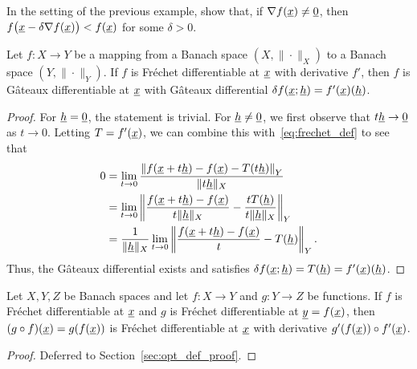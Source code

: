 \begin{problem}
In the setting of the previous example, show that, if $\nabla f (\underline{x}) \neq \underline{0}$, then $f\big(\underline{x}-\delta \nabla f(\underline{x})\big) < f(\underline{x})$ for some $\delta >0$.
\end{problem}

\begin{theorem} \label{theorem:frechet2gateaux}
Let $f \colon X \rightarrow Y$ be a mapping from a Banach space $(X,\|\cdot\|_X)$ to a Banach space $(Y,\|\cdot\|_Y)$.
If $f$ is Fr\'{e}chet differentiable at $\underline{x}$ with derivative $f'$, then $f$ is G\^{a}teaux differentiable at $\underline{x}$ with G\^{a}teaux differential $\delta f (\underline{x};\underline{h}) = f'(\underline{x}) (\underline{h})$.
\end{theorem}
\begin{proof}
For $\underline{h} = \underline{0}$, the statement is trivial.
For $\underline{h} \neq \underline{0}$, we first observe that $t\underline{h} \to \underline{0}$ as $t \to 0$.
Letting $T=f'(\underline{x})$, we can combine this with~\eqref{eq:frechet_def} to see that
\begin{align*}
0 &= \lim_{t \to 0} \frac{\left\|f(\underline{x}+ t\underline{h}) - f(\underline{x}) - T(t\underline{h}) \right\|_Y}{\| t\underline{h} \|_X} \\
&= \lim_{t \to 0} \left\|\frac{f(\underline{x}+ t\underline{h}) - f(\underline{x})}{t \| \underline{h} \|_X} - \frac{ t T(\underline{h})}{t \| \underline{h} \|_X} \right\|_Y \\
&= \frac{1}{\| \underline{h} \|_X}  \lim_{t \to 0} \left\|\frac{f(\underline{x}+ t\underline{h}) - f(\underline{x})}{t} - T(\underline{h}) \right\|_Y.
\end{align*}
Thus, the G\^{a}teaux differential exists and satisfies $\delta f (\underline{x};\underline{h}) = T (\underline{h}) = f'(\underline{x}) (\underline{h})$.
\end{proof}

\begin{theorem} \label{thm:frechet_chain_rule}
Let $X,Y,Z$ be Banach spaces and let $f \colon X \rightarrow Y$ and $g\colon Y \to Z$ be functions.
If $f$ is Fr\'{e}chet differentiable at $\underline{x}$ and $g$ is Fr\'{e}chet differentiable at $\underline{y}=f(\underline{x})$, then $(g \circ f) (\underline{x}) = g(f(\underline{x}))$ is Fr\'{e}chet differentiable at $\underline{x}$ with derivative $g'(f(\underline{x}))\circ f'(\underline{x})$.
\end{theorem}

\begin{proof}
Deferred to Section~\ref{sec:opt_def_proof}.
\end{proof}


